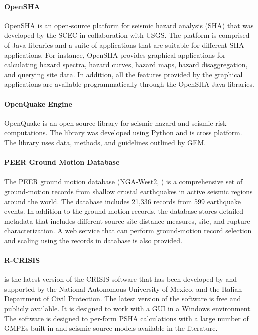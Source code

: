 \paragraph{OpenSHA} OpenSHA \citep{field2003opensha} is an open-source platform for seismic hazard analysis (SHA) that was developed by the SCEC in collaboration with USGS. The platform is comprised of Java libraries and a suite of applications that are suitable for different SHA applications. For instance, OpenSHA provides graphical applications for calculating hazard spectra, hazard curves, hazard maps, hazard disaggregation, and querying site data. In addition, all the features provided by the graphical applications are available programmatically through the OpenSHA Java libraries.

\paragraph{OpenQuake Engine} OpenQuake \citep{pagani2014openquake} is an open-source library for seismic hazard and seismic risk computations. The library was developed using Python and is cross platform. The library uses data, methods, and guidelines outlined by GEM.

\paragraph{PEER Ground Motion Database} The PEER ground motion database (NGA-West2, \cite{ancheta2014ngawest2}) is a comprehensive set of ground-motion records from shallow crustal earthquakes in active seismic regions around the world. The database includes 21,336 records from 599 earthquake events. In addition to the ground-motion records, the database stores detailed metadata that includes different source-site distance measures, site, and rupture characterization. A web service that can perform ground-motion record selection and scaling using the records in database is also provided.

\paragraph{R-CRISIS }  is the latest version of the CRISIS software that has been developed by \cite{ordaz2013crisis2008} and supported by the National Autonomous University of Mexico, and the Italian Department of Civil Protection. The latest version of the software is free and publicly available. It is designed to work with a GUI in a Windows environment. The software is designed to per-form PSHA calculations with a large number of GMPEs built in and seismic-source models available in the literature.

